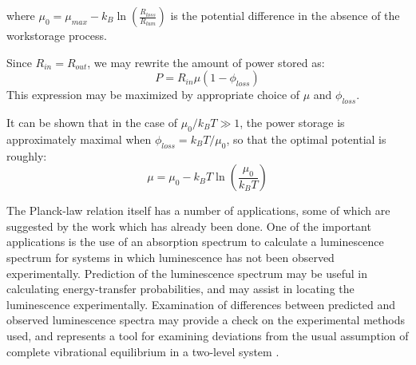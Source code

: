 \documentclass[book.tex]{subfiles}
\begin{document}
\noindent where $\mu_0 = \mu_{max} - k_B\ln\left( \frac{R_{loss}}{R_{lum}}\right)$ is the potential difference in the absence of the workstorage process.

Since $R_{in} = R_{out}$, we may rewrite the amount of power stored as:
\begin{equation}\label{Eq16}
P=R_{in}\mu(1-\phi_{loss})
\end{equation}
This expression may be maximized by appropriate choice of $\mu$ and $\phi_{loss}$.

It can be shown that in the case of $\mu_0/k_BT\gg 1$, the power storage is approximately maximal when $\phi_{loss}=k_BT/\mu_0$, so that the optimal potential is roughly:
\begin{equation}\label{Eq17}
\mu=\mu_0 -k_BT\ln\left(\frac{\mu_0}{k_BT}\right)
\end{equation}

The Planck-law relation itself has a number of applications, some of which are suggested by the work which has already been done. One of the important applications is the use of an absorption spectrum to calculate a luminescence spectrum for systems in which luminescence has not been observed experimentally. Prediction of the luminescence spectrum may be useful in calculating energy-transfer probabilities, and may assist in locating the luminescence experimentally. Examination of differences between predicted and observed luminescence spectra may provide a check on the experimental methods used, and represents a tool for examining deviations from the usual assumption of complete vibrational equilibrium in a two-level system \cite{Ross1967a}.
\end{document}
